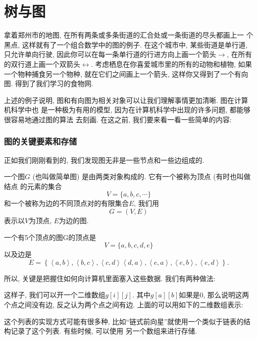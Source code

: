 \part{树与图}

拿着郑州市的地图, 在所有两条或多条街道的汇合处或一条街道的尽头都画上一
个黑点, 这样就有了一个组合数学中的图的例子. 在这个城市中, 某些街道是单行道, 
只允许单向行驶, 因此你可以在每一条单行道的行进方向上画一个箭头$\rightarrow$, 
在所有的双行道上画一个双箭头$\leftrightarrow$. 
考虑栖息在你喜爱城市里的所有的动物和植物, 如果一个物种捕食另一个物种, 
就在它们之间画上一个箭头, 这样你又得到了一个有向图. 得到了我们学习的食物网. 

上述的例子说明, 图和有向图为相关对象可以让我们理解事情更加清晰. 图在计算机科学中也
是一种极为有用的模型, 因为在计算机科学中出现的许多问题, 都能够很容易地通过图的算法
去刻画. 在这之前, 我们要来看一看一些简单的内容: 

\section{图的关键要素和存储}

正如我们刚刚看到的, 我们发现图无非是一些节点和一些边组成的. 

\begin{definition}
一个图$G$ (也叫做简单图) 是由两类对象构成的. 它有一个被称为顶点 (有时也叫做结点
的元素的集合
$$
V=\{a,b,c,\cdots\}
$$
和一个被称为边的不同顶点对的有限集合$E$, 我们用
$$
G=(V,E)
$$
表示以$V$为顶点, $E$为边的图. 
\end{definition}

\begin{example}
一个有5个顶点的图G的顶点是
$$
V=\{a,b,c,d,e\}
$$
以及边是
$$
E=\left\{\left\langle a,b\right\rangle,\left\langle b,c\right\rangle,\left\langle c,d\right\rangle\left\langle d,a\right\rangle,\left\langle e,a\right\rangle,\left\langle e,b\right\rangle,\left\langle e,d\right\rangle\right\}.
$$
\end{example}

所以, 关键是把握住如何向计算机里面塞入这些数据. 我们有两种做法: 

 这样子, 我们可以开一个二维数组$g[i][j]$. 
其中$g[a][b]$如果是0, 那么说明这两个点之间没有边, 反之认为两个点之间有边. 
上面的可以用如下的二维数组表示: 

 这个列表的实现方式可能有很多种, 
比如``链式前向星''就使用一个类似于链表的结构记录了这个列表. 有些时候, 可以使用
另一个数组来进行存储. 

